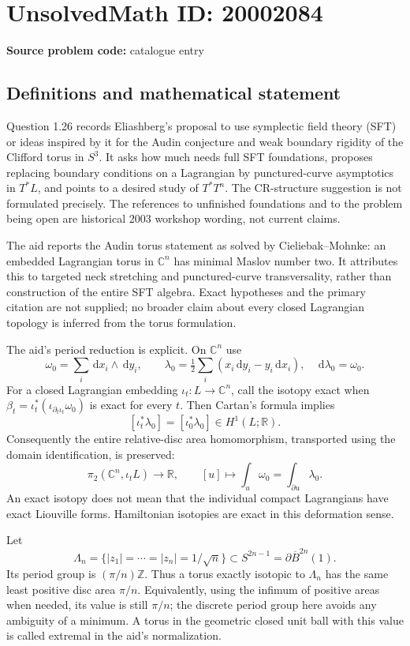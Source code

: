 \documentclass[11pt]{article}
\newcommand{\Z}{\mathbb{Z}}
\newcommand{\R}{\mathbb{R}}
\newcommand{\C}{\mathbb{C}}
\newcommand{\dd}{\,\mathrm{d}}
\begin{document}
\section*{UnsolvedMath ID: 20002084}
\textbf{Source problem code:} catalogue entry
\subsection{Definitions and mathematical statement}
Question 1.26 records Eliashberg's proposal to use symplectic field theory (SFT) or ideas inspired by it for the Audin conjecture and weak boundary rigidity of the Clifford torus in \(S^3\). It asks how much needs full SFT foundations, proposes replacing boundary conditions on a Lagrangian by punctured-curve asymptotics in \(T^*L\), and points to a desired study of \(T^*T^n\). The CR-structure suggestion is not formulated precisely. The references to unfinished foundations and to the problem being open are historical 2003 workshop wording, not current claims.

The aid reports the Audin torus statement as solved by Cieliebak--Mohnke: an embedded Lagrangian torus in \(\C^n\) has minimal Maslov number two. It attributes this to targeted neck stretching and punctured-curve transversality, rather than construction of the entire SFT algebra. Exact hypotheses and the primary citation are not supplied; no broader claim about every closed Lagrangian topology is inferred from the torus formulation.

The aid's period reduction is explicit. On \(\C^n\) use
\[
 \omega_0=\sum_i\dd x_i\wedge\dd y_i,\qquad
 \lambda_0=\tfrac12\sum_i(x_i\dd y_i-y_i\dd x_i),
 \quad\dd\lambda_0=\omega_0.
\]
For a closed Lagrangian embedding \(\iota_t:L\to\C^n\), call the isotopy exact when
\(\beta_t=\iota_t^*(\iota_{\partial_t\iota_t}\omega_0)\) is exact for every \(t\). Then Cartan's formula implies
\[
 [\iota_t^*\lambda_0]=[\iota_0^*\lambda_0]\in H^1(L;\R).
\]
Consequently the entire relative-disc area homomorphism, transported using the domain identification, is preserved:
\[
 \pi_2(\C^n,\iota_tL)\longrightarrow\R,
 \qquad[u]\longmapsto\int_u\omega_0
       =\int_{\partial u}\lambda_0.
\]
An exact isotopy does not mean that the individual compact Lagrangians have exact Liouville forms. Hamiltonian isotopies are exact in this deformation sense.

Let
\[
 \Lambda_n=\{|z_1|=\cdots=|z_n|=1/\sqrt n\}
 \subset S^{2n-1}=\partial\overline B^{2n}(1).
\]
Its period group is \((\pi/n)\Z\). Thus a torus exactly isotopic to \(\Lambda_n\) has the same least positive disc area \(\pi/n\). Equivalently, using the infimum of positive areas when needed, its value is still \(\pi/n\); the discrete period group here avoids any ambiguity of a minimum. A torus in the geometric closed unit ball with this value is called extremal in the aid's normalization.
\end{document}
